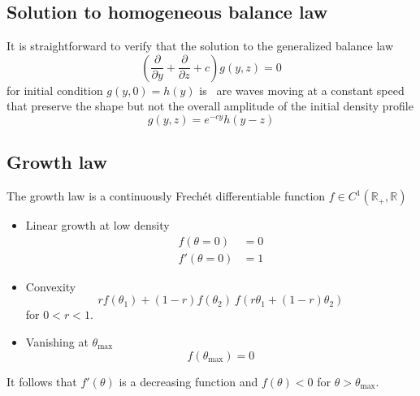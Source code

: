 \documentclass[12pt]{amsart}
\begin{document}
\subsection{Solution to homogeneous balance law}

It is straightforward to verify that the
solution to the generalized balance law 
\begin{equation}
  \left(\frac{\partial}{\partial y} + 
  \frac{\partial}{\partial z} + c\right)g(y, z) = 0
  \label{eq:homogeneous_conservation_law}
\end{equation}
for initial condition $g(y, 0) = h(y)$ is~\cite[Equation
  4.2.1.1]{PolyaninSaitsevMoussiaux:2002} are waves moving at a
constant speed that preserve the shape but not the overall amplitude
of the initial density profile
\begin{equation}
  g(y, z) = e^{-cy}h(y-z)
  \label{eq:homogeneous_conservation_solution}
\end{equation}
 

\subsection{Growth law}

The growth law is a continuously Frech\'et differentiable function $f \in
C^{1}\left(\mathbb{R}_{+}, \mathbb{R}\right)$
\begin{itemize}
\item Linear growth at low density
  \begin{align}
    f(\theta=0) &= 0 \\
    f'(\theta = 0) &= 1
  \end{align}
\item Convexity
  \begin{equation}
    rf(\theta_1) + (1-r)f(\theta_2) \ f\left(r\theta_1 + (1-r)\theta_2\right)
  \end{equation}
  for $0 < r < 1$.
\item Vanishing at $\theta_{\text{max}}$
  \begin{equation}
    f(\theta_{\text{max}}) = 0
  \end{equation}
\end{itemize}

It follows that $f'(\theta)$ is a decreasing function and $f(\theta) <
0$ for $\theta>\theta_{\text{max}}$.  

\end{document}
